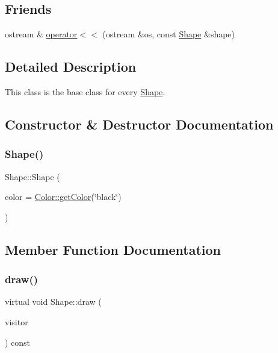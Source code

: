 \subsection*{Friends}
\begin{DoxyCompactItemize}
\item 
ostream \& \hyperlink{class_shape_ada7f3e97b3113c4725bf7ec7293b5a36}{operator$<$$<$} (ostream \&os, const \hyperlink{class_shape}{Shape} \&shape)
\end{DoxyCompactItemize}


\subsection{Detailed Description}
This class is the base class for every \hyperlink{class_shape}{Shape}. 

\subsection{Constructor \& Destructor Documentation}
\hypertarget{class_shape_a6a2e4f913c228a1a167062035ba7e898}{}\label{class_shape_a6a2e4f913c228a1a167062035ba7e898} 
\subsubsection{\texorpdfstring{Shape()}{Shape()}}
{\footnotesize\ttfamily Shape\+::\+Shape (\begin{DoxyParamCaption}\item[{const \hyperlink{class_color}{Color} \&}]{color = {\ttfamily \hyperlink{class_color_a94697e8c9eb81124c5a7c1439e1e7348}{Color\+::get\+Color}(\char`\"{}black\char`\"{})} }\end{DoxyParamCaption})}



\subsection{Member Function Documentation}
\hypertarget{class_shape_ae67fc6d39dd33759b65ff6112b21eab7}{}\label{class_shape_ae67fc6d39dd33759b65ff6112b21eab7} 
\subsubsection{\texorpdfstring{draw()}{draw()}}
{\footnotesize\ttfamily virtual void Shape\+::draw (\begin{DoxyParamCaption}\item[{\hyperlink{class_drawing_visitor}{Drawing\+Visitor} $\ast$}]{visitor }\end{DoxyParamCaption}) const\hspace{0.3cm}{\ttfamily [pure virtual]}}

